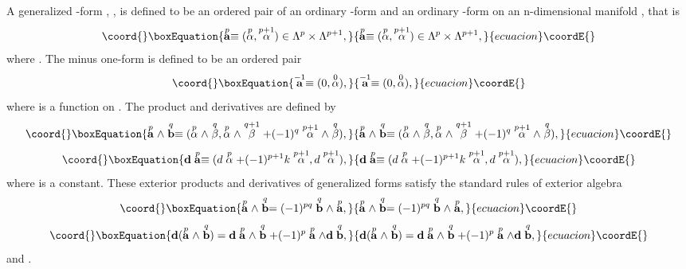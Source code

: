 \documentclass[a4paper,twocolumn,showpacs,prd]{revtex4}
\begin{document}
A generalized \coordHE{}-form \cite{Sparling}\cite{NR2001},
\coordHE{}, is defined to be an ordered pair of an ordinary
\coordHE{}-form \coordHE{} and an ordinary \coordHE{}-form
\coordHE{} on an n-dimensional manifold \coordHE{}, that is
\begin{equation}\coord{}\boxEquation{
\GForm{p}{a} \equiv (\Form{p}{\alpha},\Form{p+1}{\alpha}) \in
\Lambda^p \times \Lambda^{p+1} ,
}{
\GForm{p}{a} \equiv (\Form{p}{\alpha},\Form{p+1}{\alpha}) \in
\Lambda^p \times \Lambda^{p+1} ,
}{ecuacion}\coordE{}\end{equation}
where \coordHE{}. The minus one-form is defined to be an
ordered pair
\begin{equation}\coord{}\boxEquation{
\GForm{-1}{a}\equiv (0, \Form{0}{\alpha}) ,
}{
\GForm{-1}{a}\equiv (0, \Form{0}{\alpha}) ,
}{ecuacion}\coordE{}\end{equation}
where \coordHE{} is a function on \coordHE{}. The product and
derivatives are defined by
\begin{equation}\coord{}\boxEquation{
\GForm{p}{a} \wedge \GForm{q}{b}\equiv ( \Form{p}{\alpha}\wedge
\Form{q}{\beta}, \Form{p}{\alpha} \wedge \Form{q+1}{\beta}+(-1)^q
\Form{p+1}{\alpha}\wedge \Form{q}{\beta}) ,
}{
\GForm{p}{a} \wedge \GForm{q}{b}\equiv ( \Form{p}{\alpha}\wedge
\Form{q}{\beta}, \Form{p}{\alpha} \wedge \Form{q+1}{\beta}+(-1)^q
\Form{p+1}{\alpha}\wedge \Form{q}{\beta}) ,
}{ecuacion}\coordE{}\end{equation}
\begin{equation}\coord{}\boxEquation{
\Gd \GForm{p}{a} \equiv ( d \Form{p}{\alpha}+(-1)^{p+1} k
\Form{p+1}{\alpha}, d \Form{p+1}{\alpha}) ,
}{
\Gd \GForm{p}{a} \equiv ( d \Form{p}{\alpha}+(-1)^{p+1} k
\Form{p+1}{\alpha}, d \Form{p+1}{\alpha}) ,
}{ecuacion}\coordE{}\end{equation}
where \coordHE{} is a constant. These exterior products
and derivatives of generalized forms satisfy the
standard rules of exterior algebra
\begin{equation}\coord{}\boxEquation{
\GForm{p}{a} \wedge \GForm{q}{b} = (-1)^{pq} \GForm{q}{b} \wedge
\GForm{p}{a} ,
}{
\GForm{p}{a} \wedge \GForm{q}{b} = (-1)^{pq} \GForm{q}{b} \wedge
\GForm{p}{a} ,
}{ecuacion}\coordE{}\end{equation}
\begin{equation}\coord{}\boxEquation{
\Gd (\GForm{p}{a} \wedge \GForm{q}{b}) = \Gd \GForm{p}{a} \wedge
\GForm{q}{b} + (-1)^{p} \GForm{p}{a} \wedge \Gd \GForm{q}{b} ,
}{
\Gd (\GForm{p}{a} \wedge \GForm{q}{b}) = \Gd \GForm{p}{a} \wedge
\GForm{q}{b} + (-1)^{p} \GForm{p}{a} \wedge \Gd \GForm{q}{b} ,
}{ecuacion}\coordE{}\end{equation}
and \coordHE{}.
\end{document}
